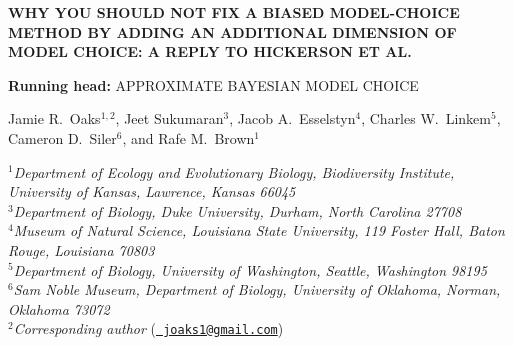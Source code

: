 \documentclass[letterpaper,12pt]{article}
\newcommand{\msTitle}{Why you should not fix a biased model-choice method by
adding an additional dimension of model choice: A reply to Hickerson et al.
\xspace}
\begin{document}
\doublespacing
\raggedright
\setlength{\parindent}{0.5in}
\begin{linenumbers}

\begin{titlepage}
    \begin{flushleft}
        \sffamily

        \MakeUppercase{\large\bfseries \msTitle}

        \vspace{12pt}
        \textbf{Running head:} \MakeUppercase{Approximate Bayesian model
        choice}

        \vspace{12pt}
        Jamie R.\ Oaks$^{1,2}$, Jeet Sukumaran$^{3}$, Jacob A.\
        Esselstyn$^{4}$, Charles W.\ Linkem$^{5}$, Cameron D.\
        Siler$^{6}$, and Rafe M.\ Brown$^{1}$

        \bigskip
        $^1$\emph{Department of Ecology and Evolutionary Biology,
            Biodiversity Institute,
            University of Kansas,
            Lawrence, Kansas 66045}\\[.1in]
        $^3$\emph{Department of Biology,
            Duke University,
            Durham, North Carolina 27708} \\[.1in]
        $^4$\emph{Museum of Natural Science,
            Louisiana State University,
            119 Foster Hall,
            Baton Rouge, Louisiana 70803}\\[.1in]
        $^5$\emph{Department of Biology,
            University of Washington,
            Seattle, Washington 98195}\\[.1in]
        $^6$\emph{Sam Noble Museum,
            Department of Biology,
            University of Oklahoma,
            Norman, Oklahoma 73072}\\[.1in]
        $^2$\emph{Corresponding author} (\href{mailto:joaks1@gmail.com}{\tt
        joaks1@gmail.com})\\

    \end{flushleft}
\end{titlepage}


\end{linenumbers}
\end{document}
